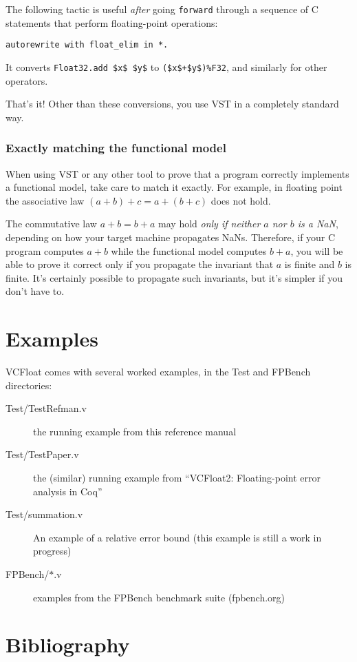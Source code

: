 \documentclass[article]{memoir}
\begin{document}
The following tactic is useful \emph{after} going \lstinline{forward}
through a sequence of C statements that perform floating-point
operations:
\begin{lstlisting}
autorewrite with float_elim in *.
\end{lstlisting}
It converts \lstinline{Float32.add $x$ $y$} to \lstinline{($x$+$y$)%F32},
  and similarly for other operators.

That's it!  Other than these conversions, you use VST in
a completely standard way.  

\subsection*{Exactly matching the functional model}

When using VST or any other tool to prove that a program correctly
implements a functional model, take care to
match it exactly.  For example, in floating point the
associative law $(a+b)+c=a+(b+c)$ does not hold.

The commutative law $a+b=b+a$ may hold \emph{only if
neither $a$ nor $b$ is a NaN}, depending on how your target
machine propagates NaNs.  Therefore, if your C program
computes $a+b$ while the functional model computes $b+a$,
you will be able to prove it correct only if you propagate
the invariant that $a$ is finite and $b$ is finite.
It's certainly possible to propagate such invariants, but
it's simpler if you don't have to.

\chapter{Examples}

VCFloat comes with several worked examples, in the Test and FPBench directories:
\begin{description}
\item[Test/TestRefman.v]  the running example from this reference manual
\item[Test/TestPaper.v]  the (similar) running example from ``VCFloat2: Floating-point error analysis in Coq''
\item[Test/summation.v]  An example of a relative error bound (this example is still a work in progress)
\item[FPBench/$*$.v]  examples from the FPBench benchmark suite (fpbench.org)
\end{description}

\chapter{Bibliography}
\end{document}
